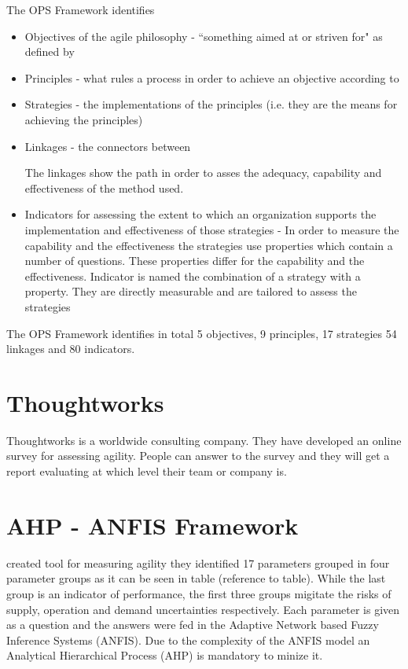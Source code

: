 
The OPS Framework identifies 
\begin{itemize}
\item Objectives of the agile philosophy - ``something aimed at or striven for" as defined by \cite{2604}
\item Principles - what rules a process in order to achieve an objective according to \cite{2604}
\item Strategies - the implementations of the principles (i.e. they are the means for achieving the principles)
\item Linkages - the connectors between 
The linkages show the path in order to asses the adequacy, capability and effectiveness of the method used.
\item Indicators for assessing the extent to which an organization supports the implementation and effectiveness of those strategies - In order to measure the capability and the effectiveness the strategies use properties which contain a number of questions. These properties differ for the capability and the effectiveness. Indicator is named the combination of a strategy with a property. They are directly measurable and are tailored to assess the strategies
\end{itemize}

The OPS Framework identifies in total 5 objectives, 9 principles, 17 strategies 54 linkages and 80 indicators.

\section{Thoughtworks}
Thoughtworks \cite{thoughtworks} is a worldwide consulting company. They have developed an online survey for assessing agility. People can answer to the survey and they will get a report evaluating at which level their team or company is.

\section{AHP - ANFIS Framework}
\citet{poonacha} created tool for measuring agility they identified 17 parameters grouped in four parameter groups as it can be seen in table (reference to table). While the last group is an indicator of performance, the first three groups migitate the risks of supply, operation and demand uncertainties respectively. Each parameter is given as a question and the answers were fed in the Adaptive Network based Fuzzy Inference Systems (ANFIS). Due to the complexity of the ANFIS model an Analytical Hierarchical Process (AHP) is mandatory to minize it.

